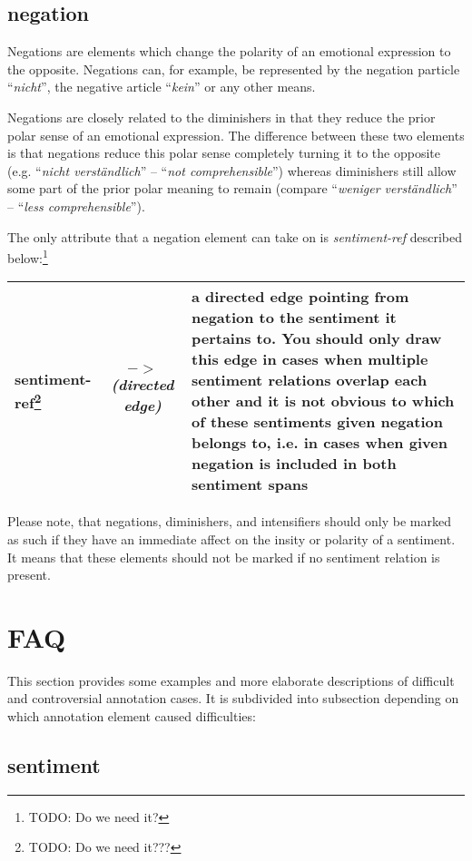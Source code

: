 \documentclass[11pt,a4paper]{article}
\begin{document}
\subsection{negation}
Negations are elements which change the polarity of an emotional
expression to the opposite.  Negations can, for example, be
represented by the negation particle ``\textit{nicht}'', the negative
article ``\textit{kein}'' or any other means.

Negations are closely related to the diminishers in that they reduce
the prior polar sense of an emotional expression.  The difference
between these two elements is that negations reduce this polar sense
completely turning it to the opposite (e.g. ``\textit{nicht
  verst\"andlich}'' -- ``\textit{not comprehensible}'') whereas
diminishers still allow some part of the prior polar meaning to remain
(compare ``\textit{weniger verst\"andlich}'' -- ``\textit{less
  comprehensible}'').

The only attribute that a negation element can take on is
\textit{sentiment-ref} described below:\footnote{TODO: Do we need it?}

\begin{tabular}{|l|c|p{}|}\hline
  sentiment-ref\footnote{TODO: Do we need it???} &
  \textit{$->$\newline(directed edge)} & a directed edge pointing from
  negation to the sentiment it pertains to. You should only draw this
  edge in cases when multiple sentiment relations overlap each other
  and it is not obvious to which of these sentiments given negation
  belongs to, i.e. in cases when given negation is included in both
  sentiment spans\\\hline
\end{tabular}

Please note, that negations, diminishers, and intensifiers should only
be marked as such if they have an immediate affect on the insity or
polarity of a sentiment.  It means that these elements should not be
marked if no sentiment relation is present.

\section{FAQ}
This section provides some examples and more elaborate descriptions of
difficult and controversial annotation cases.  It is subdivided into
subsection depending on which annotation element caused difficulties:

\subsection{sentiment}
\end{document}
